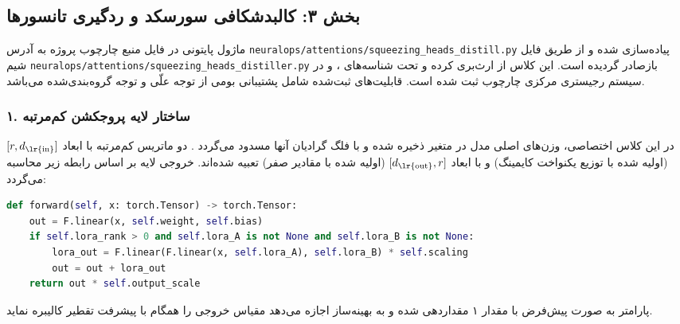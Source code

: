 \subsection*{بخش ۳: کالبدشکافی سورسکد و ردگیری تانسورها }
ماژول پایتونی  در فایل منبع چارچوب پروژه به آدرس \nolinkurl{neuralops/attentions/squeezing_heads_distill.py} پیاده‌سازی شده و از طریق فایل شیم \nolinkurl{neuralops/attentions/squeezing_heads_distiller.py} بازصادر گردیده است. این کلاس از  ارث‌بری کرده و تحت شناسه‌های ،  و  در سیستم رجیستری مرکزی چارچوب  ثبت شده است. قابلیت‌های ثبت‌شده شامل پشتیبانی بومی از توجه علّی  و توجه گروه‌بندی‌شده  می‌باشد.

\subsubsection*{۱. ساختار لایه پروجکشن کم‌مرتبه }
در این کلاس اختصاصی، وزن‌های اصلی مدل در متغیر  ذخیره شده و با فلگ  گرادیان آنها مسدود می‌گردد . دو ماتریس کم‌مرتبه  با ابعاد $[r, d_{\text{\lr{in}}}]$ (اولیه شده با توزیع یکنواخت کایمینگ) و  با ابعاد $[d_{\text{\lr{out}}}, r]$ (اولیه شده با مقادیر صفر) تعبیه شده‌اند. خروجی لایه بر اساس رابطه زیر محاسبه می‌گردد:
\begin{lstlisting}[language=Python]
def forward(self, x: torch.Tensor) -> torch.Tensor:
    out = F.linear(x, self.weight, self.bias)
    if self.lora_rank > 0 and self.lora_A is not None and self.lora_B is not None:
        lora_out = F.linear(F.linear(x, self.lora_A), self.lora_B) * self.scaling
        out = out + lora_out
    return out * self.output_scale
\end{lstlisting}
پارامتر  به صورت پیش‌فرض با مقدار ۱ مقداردهی شده و به بهینه‌ساز اجازه می‌دهد مقیاس خروجی را همگام با پیشرفت تقطیر کالیبره نماید.

